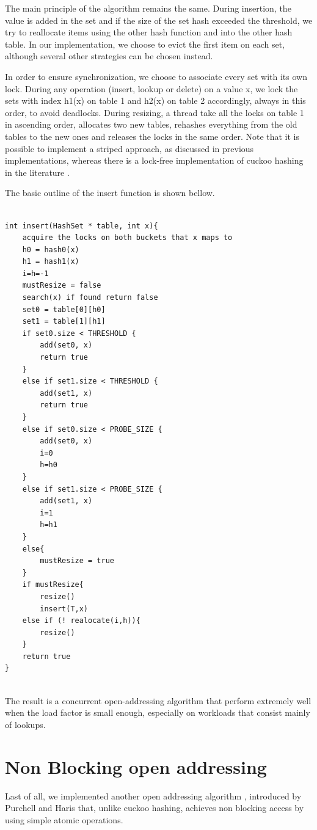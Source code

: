 The main principle of the algorithm remains the same. During insertion, the value is added in the set and if the size of the set hash exceeded the threshold, we try to reallocate items using the other hash function and into the other hash table.  In our implementation, we choose to evict the first item on each set, although several other strategies can be chosen instead.

In order to ensure synchronization, we choose to associate every set with its own lock. During any operation (insert, lookup or delete) on a value x, we lock the sets with index h1(x) on table 1 and h2(x) on table 2 accordingly, always in this order, to avoid deadlocks. During resizing, a thread take all the locks on table 1 in ascending order, allocates two new tables, rehashes everything from the old tables to the new ones and releases the locks in the same order. Note that it is possible to implement a striped approach, as discussed in previous implementations, whereas there is a lock-free implementation of cuckoo hashing in the literature \cite{lock_free_cuckoo}.

The basic outline of the insert function is shown bellow.

\begin{lstlisting}

int insert(HashSet * table, int x){
	acquire the locks on both buckets that x maps to
	h0 = hash0(x)
	h1 = hash1(x)
	i=h=-1
	mustResize = false
	search(x) if found return false
	set0 = table[0][h0]
	set1 = table[1][h1]
	if set0.size < THRESHOLD {
		add(set0, x)
		return true
	}
	else if set1.size < THRESHOLD {
		add(set1, x)
		return true
	}
	else if set0.size < PROBE_SIZE {
		add(set0, x)
		i=0 
		h=h0
	}
	else if set1.size < PROBE_SIZE {
		add(set1, x)
		i=1
		h=h1
	}
	else{
		mustResize = true
	}
	if mustResize{
		resize()	
		insert(T,x)
	else if (! realocate(i,h)){
		resize()
	}
	return true
}
		

\end{lstlisting}

The result is a concurrent open-addressing algorithm that perform extremely well when the load factor is small enough, especially on workloads that consist mainly of lookups.


\section{Non Blocking  open addressing}

Last of all, we implemented another open addressing algorithm , introduced by Purchell and Haris \cite{non_blocking_open_addressing} that, unlike cuckoo hashing,  achieves non blocking access by using simple atomic operations.

